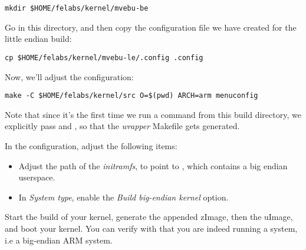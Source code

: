 \begin{verbatim}
mkdir $HOME/felabs/kernel/mvebu-be
\end{verbatim}

Go in this directory, and then copy the configuration file we have
created for the little endian build:

\begin{verbatim}
cp $HOME/felabs/kernel/mvebu-le/.config .config
\end{verbatim}

Now, we'll adjust the configuration:

\begin{verbatim}
make -C $HOME/felabs/kernel/src O=$(pwd) ARCH=arm menuconfig
\end{verbatim}

Note that since it's the first time we run a  command from
this build directory, we explicitly pass  and , so
that the {\em wrapper} Makefile gets generated.

In the configuration, adjust the following items:

\begin{itemize}
\item Adjust the path of the {\em initramfs}, to point to
  , which
  contains a big endian userspace.
\item In {\em System type}, enable the {\em Build big-endian kernel}
  option.
\end{itemize}

Start the build of your kernel, generate the appended zImage, then the
uImage, and boot your kernel. You can verify with  that
you are indeed running a  system, i.e a big-endian ARM
system.
